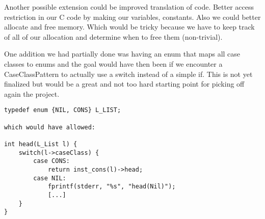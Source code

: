 Another possible extension could be improved translation of code. Better access restriction in our C code by making our variables, constants. Also we could better allocate and free memory. Which would be tricky because we have to keep track of all of our allocation and determine when to free them (non-trivial).

One addition we had partially done was having an enum that maps all case classes to enums and the goal would have then been if we encounter a CaseClassPattern to actually use a switch instead of a simple if. This is not yet finalized but would be a great and not too hard starting point for picking off again the project.

\begin{lstlisting}
typedef enum {NIL, CONS} L_LIST;

which would have allowed:

int head(L_List l) {	
	switch(l->caseClass) {
		case CONS:
			return inst_cons(l)->head;
		case NIL:
			fprintf(stderr, "%s", "head(Nil)");
			[...]
	}
}
\end{lstlisting}